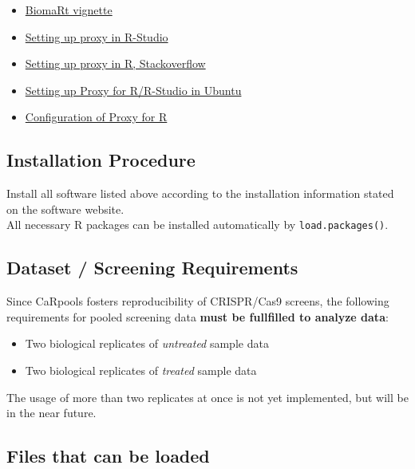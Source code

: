 \documentclass[]{article}
\providecommand{\tightlist}{%
  \setlength{\itemsep}{0pt}\setlength{\parskip}{0pt}}
\begin{document}
\begin{itemize}
\tightlist
\item
  \href{http://www.bioconductor.org/packages/release/bioc/vignettes/biomaRt/inst/doc/biomaRt.pdf}{BiomaRt
  vignette}
\item
  \href{https://support.rstudio.com/hc/en-us/articles/200488488-Configuring-R-to-Use-an-HTTP-Proxy}{Setting
  up proxy in R-Studio}
\item
  \href{http://stackoverflow.com/questions/6467277/proxy-setting-for-r}{Setting
  up proxy in R, Stackoverflow}
\item
  \href{http://askubuntu.com/questions/572722/setting-up-the-proxy-for-rstudio}{Setting
  up Proxy for R/R-Studio in Ubuntu}
\item
  \href{https://bhoom.wordpress.com/2013/05/27/configuring-r-to-use-an-http-proxy-faq-knowledge-base-rstudio-support/}{Configuration
  of Proxy for R}
\end{itemize}

\subsection{Installation Procedure}\label{installation-procedure}

Install all software listed above according to the installation
information stated on the software website.\\
All necessary R packages can be installed automatically by
\texttt{load.packages()}.

\subsection{Dataset / Screening
Requirements}\label{dataset-screening-requirements}

Since CaRpools fosters reproducibility of CRISPR/Cas9 screens, the
following requirements for pooled screening data \textbf{must be
fullfilled to analyze data}:

\begin{itemize}
\tightlist
\item
  Two biological replicates of \emph{untreated} sample data
\item
  Two biological replicates of \emph{treated} sample data
\end{itemize}

The usage of more than two replicates at once is not yet implemented,
but will be in the near future.

\subsection{Files that can be loaded}\label{files-that-can-be-loaded}
\end{document}
